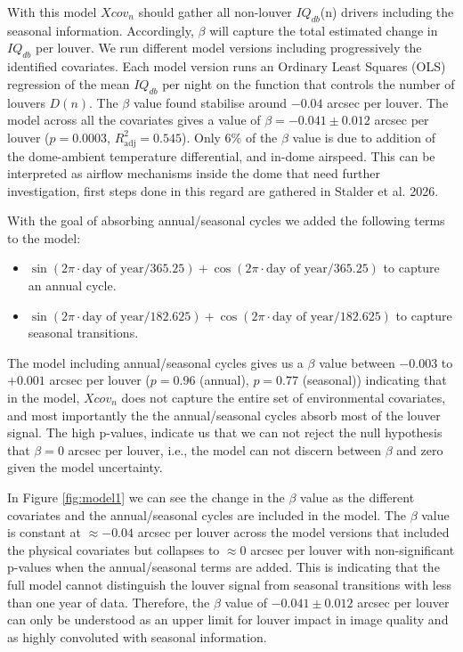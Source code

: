 \documentclass[TS,lsstdraft,authoryear,toc]{lsstdoc}
\begin{document}
With this model ${Xcov}_n$ should gather all non-louver $IQ_{db}$(n) drivers including the seasonal information. Accordingly, $\beta$ will capture the total estimated change in $IQ_{db}$ per louver. We run different model versions including progressively the identified covariates. Each model version runs an Ordinary Least Squares (OLS) regression of the mean $IQ_{db}$ per night on the function that controls the number of louvers $D(n)$. The $\beta$ value found stabilise around $-0.04$ arcsec per louver. The model across all the covariates gives a value of $\beta=-0.041 \pm 0.012$ arcsec per louver ($p=0.0003$,  $R^2_{\text{adj}}=0.545$). Only 6\% of the $\beta$ value is due to addition of the dome-ambient temperature differential, and in-dome airspeed. This can be interpreted as airflow mechanisms inside the dome that need further investigation, first steps done in this regard are gathered in Stalder et al. 2026.

With the goal of absorbing annual/seasonal cycles we added the following terms to the model:
\begin{itemize}
	\item $\sin(2\pi \cdot \text{day of year}/365.25) + \cos(2\pi \cdot \text{day of year}/365.25)$ to capture an annual cycle. 
	\item  $\sin(2\pi \cdot \text{day of year}/182.625) + \cos(2\pi \cdot \text{day of year}/182.625)$ to capture seasonal transitions.
\end{itemize}

The model including annual/seasonal cycles gives us a $\beta$ value between $-0.003$ to $+0.001$ arcsec per louver ($p = 0.96$ (annual), $p = 0.77$ (seasonal)) indicating that in the model, ${Xcov}_n$ does not capture the entire set of environmental covariates, and most importantly the the annual/seasonal cycles absorb most of the louver signal. The high p-values, indicate us that we can not reject the null hypothesis that $\beta=0$ arcsec per louver, i.e., the model can not discern between $\beta$ and zero given the model uncertainty. 

 In Figure \ref{fig:model1} we can see the change in the $\beta$ value as the different covariates and the annual/seasonal cycles are included in the model. The $\beta$ value is constant at $\approx -0.04$ arcsec per louver across the model versions that included the physical covariates but collapses to $\approx 0$ arcsec per louver with non-significant p-values when the annual/seasonal terms are added. This is indicating that the full model cannot distinguish the louver signal from seasonal transitions with less than one year of data. Therefore, the $\beta$ value of $-0.041 \pm 0.012$ arcsec per louver can only be understood as an upper limit for louver impact in image quality and as highly convoluted with seasonal information.
\end{document}
